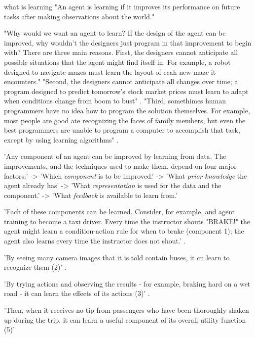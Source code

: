 what is learning
"An agent is learning if it improves its performance on future tasks after making observations about the world." \cite{russell2016artificial}

"Why would we want an agent to learn? If the design of the agent can be improved, why wouldn't the designers just program in that improvement to begin with? There are three main reasons. First, the designers cannot anticipate all possible situations that the agent might find itself in. For example, a robot designed to navigate mazes must learn the layout of ecah new maze it encounters." \cite{russell2016artificial}
"Second, the designers cannot anticipate all changes over time; a program designed to predict tomorrow's stock market prices must learn to adapt when conditions change from boom to bust" \cite{russell2016artificial}.
"Third, somethimes human programmers have no idea how to program the solution themselves. For example, most people are good ate recognizing the faces of family members, but even the best programmers are unable to program a computer to accomplish that task, except by using learning algorithms" \cite{russell2016artificial}.

'Any component of an agent can be improved by learning from data. The improvements, and the techniques used to make them, depend on four major factors:'
-> 'Which \textit{component} is to be improved.'
-> 'What \textit{prior knowledge} the agent already has'
-> 'What \textit{representation} is used for the data and the component.'
-> 'What \textit{feedback} is available to learn from.'



'Each of these components can be learned. Consider, for example, and agent training to become a taxi driver. Every time the instructor shouts "BRAKE!" the agent might learn a condition-action rule for when to brake (component 1); the agent also learns every time the instructor does not shout.' \cite{russell2016artificial}.

'By seeing many camera images that it is told contain buses, it cn learn to recognize them (2)' \cite{russell2016artificial}.

'By trying actions and observing the results - for example, braking hard on a wet road - it can learn the effects of its actions (3)' \cite{russell2016artificial}.

'Then, when it receives no tip from passengers who have been thoroughly shaken up during the trip, it can learn a useful component of its overall utility function (5)' \cite{russell2016artificial}

